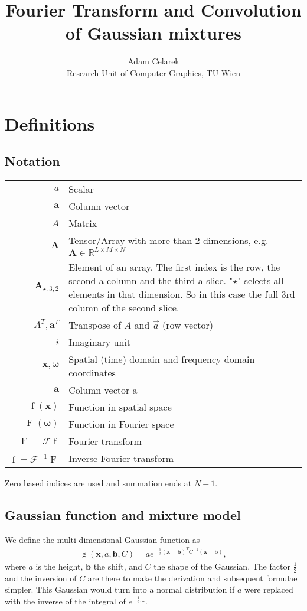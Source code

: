 \documentclass{paper}
\title{Fourier Transform and Convolution of Gaussian mixtures}
\author{Adam Celarek\\Research Unit of Computer Graphics, TU Wien}
\newcommand{\F}{\ensuremath{\mathcal{F}}}
\newcommand{\vr}[1]{\ensuremath{\boldsymbol{#1}}}
\newcommand{\tr}[1]{\ensuremath{\boldsymbol{#1}}}
\newcommand{\f}[1]{\operatorname{#1}}
\begin{document}
\maketitle

\section{Definitions}
\subsection*{Notation}
\begin{center}
	\begin{supertabular}{rp{8cm}}
		$a$	& Scalar \\
		$\vr{a}$	& Column vector \\
		$A$			& Matrix \\ 
		$\tr{A}$	& Tensor/Array with more than 2 dimensions, e.g. $\tr{A} \in \mathbb{R}^{L \times M \times N}$ \\ 
		$\tr{A}_{\star, 3, 2}$
					& Element of an array.
					The first index is the row, the second a column and the third a slice.
					"$\star$" selects all elements in that dimension.
					So in this case the full 3rd column of the second slice. \\ 
		$A^T, \vr{a}^T$
					& Transpose of $A$ and $\vec{a}$ (row vector) \\
		$i$			& Imaginary unit \\
		$\vr{x}, \vr{\omega}$
					& Spatial (time) domain and frequency domain coordinates \\
		$\vr{a}$	& Column vector a \\
		$\f{f}(\vr{x})$
					& Function in spatial space \\
		$\f{F}(\vr{\omega})$
					& Function in Fourier space \\
		$\f{F} = \F \f{f}$
					& Fourier transform \\
		$\f{f} = \F^{-1} \f{F}$
					& Inverse Fourier transform \\
	\end{supertabular}
\end{center}
Zero based indices are used and summation ends at $N-1$.

\subsection*{Gaussian function and mixture model}
We define the multi dimensional Gaussian function as
\begin{align}
\f{g}(\vr{x}, a, \vr{b}, C) = a e^{-\frac{1}{2}(\vr{x}-\vr{b})^TC^{-1}(\vr{x}-\vr{b})},
\end{align}
where $a$ is the height, $\vr{b}$ the shift, and $C$ the shape of the Gaussian.
The factor $\frac{1}{2}$ and the inversion of $C$ are there to make the derivation and subsequent formulae simpler.
This Gaussian would turn into a normal distribution if $a$ were replaced with the inverse of the integral of $e^{-\frac{1}{2}...}$.
\end{document}
